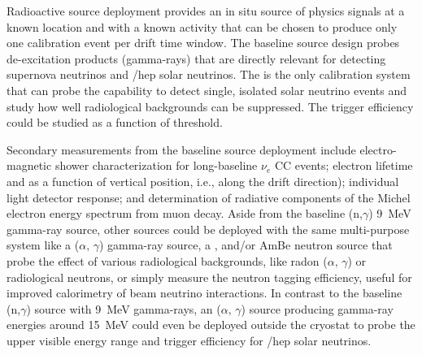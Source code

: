 


Radioactive source deployment provides an in situ source of physics signals at a known location and with a known activity that can be chosen to produce only one calibration event per drift time window. The baseline source design probes de-excitation products (gamma-rays) that are directly relevant for detecting supernova neutrinos and /hep solar neutrinos. The  is the only calibration system that can probe the capability to detect single, isolated solar neutrino events and study how well radiological backgrounds can be suppressed. The trigger efficiency could be studied %
as a function of threshold. 

Secondary measurements from the baseline source deployment include electro-magnetic  shower characterization for long-baseline $\nu_e$ CC events; electron lifetime and \efield as a function of  vertical position, i.e., along the drift direction);
individual light detector response; and determination of radiative components of the Michel electron energy spectrum from muon decay. Aside from the baseline (n,$\gamma$) \SI{9}{\MeV} gamma-ray source, other sources could be deployed with the same multi-purpose system like a ($\alpha,\,\gamma$) gamma-ray source, a , and/or AmBe neutron source that probe the effect of various radiological backgrounds, like radon ($\alpha,\,\gamma$) or radiological neutrons, or simply measure the neutron tagging efficiency, useful for improved calorimetry of beam neutrino interactions.  In contrast to the baseline (n,$\gamma$) source with \SI{9}{\MeV} gamma-rays, an ($\alpha,\,\gamma$) source producing gamma-ray energies around 15~MeV could even be deployed outside the cryostat to probe the upper visible energy range and trigger efficiency for /hep solar neutrinos. 

